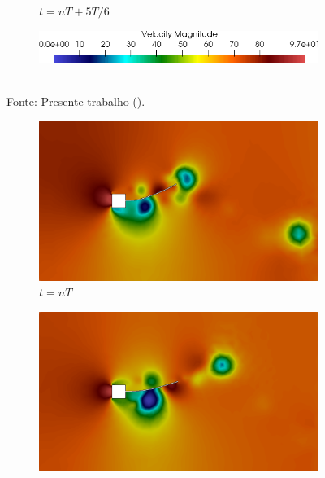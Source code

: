 \begin{figure}[h!]
\begin{subfigure}[b]{0.32\textwidth}
        \caption{$t=nT+5T/6$}
    \end{subfigure}
    \begin{subfigure}[b]{0.49\textwidth}
        \includegraphics[width=\linewidth]{Figuras/FSI-prism2/vLegenda.png}
    \end{subfigure}
    \\Fonte: Presente trabalho (\the\year).
    \label{fig:prismVel2}
\end{figure}

\begin{figure}[h!]
    \centering
    \caption{\textit{Flutter} em painel - Campo de pressões obtidos no problema de \textit{Flutter} em painel.}
    \begin{subfigure}[b]{0.32\textwidth}
        \includegraphics[width=\linewidth]{Figuras/FSI-prism2/pT1.png}
        \caption{$t=nT$}
    \end{subfigure}
    \begin{subfigure}[b]{0.32\textwidth}
        \includegraphics[width=\linewidth]{Figuras/FSI-prism2/pT2.png}

\end{subfigure}
\end{figure}
